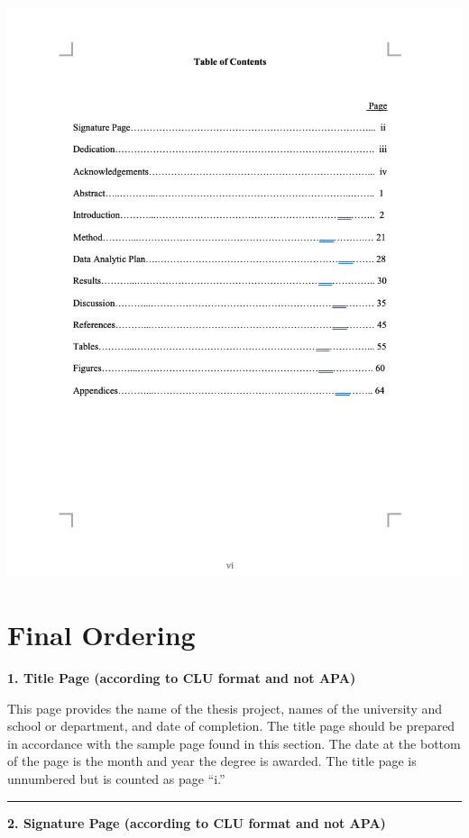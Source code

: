 \documentclass[openany]{book}
\begin{document}
\includegraphics[width=14.58in]{images/tablecontents}

\hypertarget{final-ordering}{%
\section{Final Ordering}\label{final-ordering}}

\textbf{1. Title Page (according to CLU format and not APA)}

This page provides the name of the thesis project, names of the university and school or department, and date of completion. The title page should be prepared in accordance with the sample page found in this section. The date at the bottom of the page is the month and year the degree is awarded. The title page is unnumbered but is counted as page ``i.''

\begin{center}\rule{0.5\linewidth}{0.5pt}\end{center}

\textbf{2. Signature Page (according to CLU format and not APA)}
\end{document}

